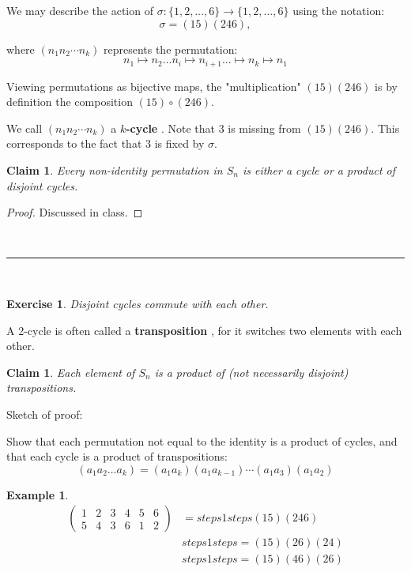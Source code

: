 \documentclass[a4paper,12pt]{report}
\newcommand{\ra}{\longrightarrow}
\newcommand{\class}{}
\newcounter{statement}
\numberwithin{statement}{chapter}
\newtheorem{claim}[statement]{Claim}
\newtheorem{eg}[statement]{\bf Example}
\newtheorem{ex}[statement]{\bf Exercise}
\numberwithin{equation}{chapter}
\numberwithin{section}{chapter}
\numberwithin{subsection}{section}
\begin{document}
We may describe the action of $\sigma : \{1, 2, \ldots, 6\} \ra \{1, 2, \ldots, 6\}$
using the notation:
\[
\sigma = (15)(246),
\]

where $(n_1 n_2\cdots n_k)$ represents the permutation:
\[
n_1 \mapsto n_2 \dots n_i \mapsto n_{i + 1} \dots \mapsto n_k \mapsto n_1
\]

Viewing permutations as bijective maps,
the "multiplication" $(15)(246)$ is by definition the composition $(15)\circ(246)$.




We call $(n_1n_2\cdots n_k)$ a  {\bf $k$-cycle} .
Note that $3$ is missing from $(15)(246)$.
This corresponds to the fact that $3$ is fixed by $\sigma$.







\begin{claim}
Every non-identity permutation in $S_n$ is either a cycle or a product of disjoint cycles.
\end{claim}
\begin{proof}
Discussed in class.
\end{proof}




\quad\\\hrule
\quad\\

\begin{ex}

Disjoint cycles commute with each other.

\end{ex}




A 2-cycle is often called a  {\bf transposition} ,
for it switches two elements with each other.



\begin{claim}
Each element of $S_n$ is a product of (not necessarily disjoint) transpositions.
\end{claim}



Sketch of proof:


Show that each permutation not equal to the identity is a product of cycles,
and that each cycle is a product of transpositions:
\[
(a_1a_2\ldots a_k) = (a_1 a_k) (a_1 a_{k - 1})\cdots(a_1 a_3)(a_1 a_2)
\]

\begin{eg}


\[
\begin{split}
\left(
\begin{matrix}
1&2&3&4&5&6\\
5&4&3&6&1&2
\end{matrix}
\right) &= 
\class{steps1 steps}{(15)(246)}
\\&
\class{steps1 steps}{= (15)(26)(24)}
\\&
\class{steps1 steps}{ = (15)(46)(26)}
\end{split}
\]


\end{eg}
\end{document}
